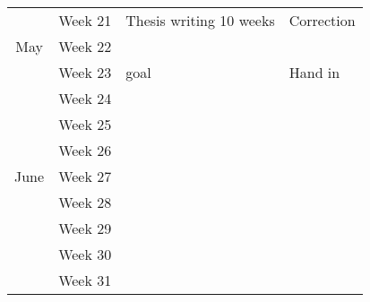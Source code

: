 \documentclass[
  a4paper,  %
  twoside,  %
  bibliography=totoc,
  headsepline,
  cleardoublepage=empty,
  parskip=half,
  draft=false
]{scrbook}
\begin{document}
\begin{tabular}{clll}
                                & Week 21      & \multirow{-10}{*}{Thesis writing  10 weeks} & \multirow{-2}{*}{Correction}                                                                                               \\
\multirow{-5}{*}{May}           & Week 22      &                                             &                                                                                                                            \\
                                & Week 23      & \multirow{-2}{*}{goal}                      & \multirow{-2}{*}{Hand in}                                                                                                  \\
                                & Week 24      & \multicolumn{1}{l}{}                        & \multicolumn{1}{l}{}                                                                                                       \\
                                & Week 25      &  \multicolumn{1}{l}{}                       & \multicolumn{1}{l}{}                                                                                                       \\
                                & Week 26      &  \multicolumn{1}{l}{}                       & \multicolumn{1}{l}{}                                                                                                       \\
\multirow{-5}{*}{June}          & Week 27      & \multicolumn{1}{l}{}                        & \multicolumn{1}{l}{}                                                                                                       \\
\multicolumn{1}{l}{}            & Week 28      & \multicolumn{1}{l}{}                        & \multicolumn{1}{l}{}                                                                                                       \\
\multicolumn{1}{l}{}            & Week 29      & \multicolumn{1}{l}{}                        & \multicolumn{1}{l}{}                                                                                                       \\
\multicolumn{1}{l}{}            & Week 30      & \multicolumn{1}{l}{}                        & \multicolumn{1}{l}{}                                                                                                       \\
\multicolumn{1}{l}{}            & Week 31      & \multicolumn{1}{l}{}                        & \multicolumn{1}{l}{}                                                                                                      
\end{tabular}




%

\pagestyle{empty}
\renewcommand*{\chapterpagestyle}{empty}
\end{document}
